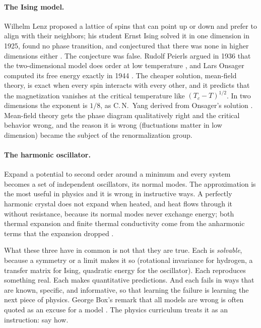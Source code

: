 \begin{refsection}
\paragraph{The Ising model.} Wilhelm Lenz proposed a lattice of spins that can point up or down and prefer to align with their neighbors; his student Ernst Ising solved it in one dimension in 1925, found no phase transition, and conjectured that there was none in higher dimensions either \parencite{Ising1925}. The conjecture was false. Rudolf Peierls argued in 1936 that the two-dimensional model does order at low temperature \parencite{Peierls1936}, and Lars Onsager computed its free energy exactly in 1944 \parencite{Onsager1944}. The cheaper solution, mean-field theory, is exact when every spin interacts with every other, and it predicts that the magnetization vanishes at the critical temperature like $(T_c-T)^{1/2}$. In two dimensions the exponent is $1/8$, as C.\,N.\ Yang derived from Onsager's solution \parencite{Yang1952}. Mean-field theory gets the phase diagram qualitatively right and the critical behavior wrong, and the reason it is wrong (fluctuations matter in low dimension) became the subject of the renormalization group.

\paragraph{The harmonic oscillator.} Expand a potential to second order around a minimum and every system becomes a set of independent oscillators, its normal modes. The approximation is the most useful in physics and it is wrong in instructive ways. A perfectly harmonic crystal does not expand when heated, and heat flows through it without resistance, because its normal modes never exchange energy; both thermal expansion and finite thermal conductivity come from the anharmonic terms that the expansion dropped \parencite{AshcroftMermin1976}.

\medskip

What these three have in common is not that they are true. Each is \emph{solvable}, because a symmetry or a limit makes it so (rotational invariance for hydrogen, a transfer matrix for Ising, quadratic energy for the oscillator). Each reproduces something real. Each makes quantitative predictions. And each fails in ways that are known, specific, and informative, so that learning the failure is learning the next piece of physics. George Box's remark that all models are wrong is often quoted as an excuse for a model \parencite{Box1979}. The physics curriculum treats it as an instruction: say how.


\end{refsection}
